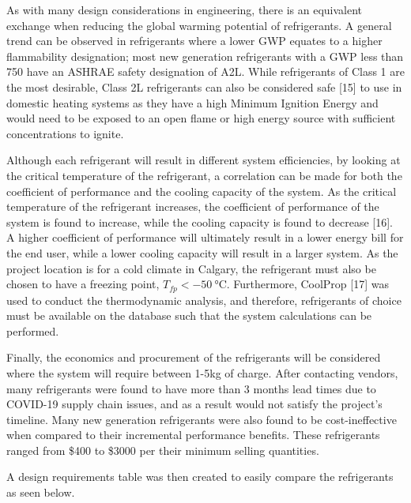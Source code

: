 \medskip
As with many design considerations in engineering, there is an equivalent exchange when reducing the global warming potential of refrigerants. A general trend can be observed in refrigerants where a lower GWP equates to a higher flammability designation; most new generation refrigerants with a GWP less than 750 have an ASHRAE safety designation of A2L. While refrigerants of Class 1 are the most desirable, Class 2L refrigerants can also be considered safe [15] to use in domestic heating systems as they have a high Minimum Ignition Energy and would need to be exposed to an open flame or high energy source with sufficient concentrations to ignite.

\medskip
Although each refrigerant will result in different system efficiencies, by looking at the critical temperature of the refrigerant, a correlation can be made for both the coefficient of performance and the cooling capacity of the system. As the critical temperature of the refrigerant increases, the coefficient of performance of the system is found to increase, while the cooling capacity is found to decrease [16]. A higher coefficient of performance will ultimately result in a lower energy bill for the end user, while a lower cooling capacity will result in a larger system. As the project location is for a cold climate in Calgary, the refrigerant must also be chosen to have a freezing point, $T_{fp} < \SI{-50}{\celsius}$. Furthermore, CoolProp [17] was used to conduct the thermodynamic analysis, and therefore, refrigerants of choice must be available on the database such that the system calculations can be performed.

\medskip
Finally, the economics and procurement of the refrigerants will be considered where the system will require between 1-5kg of charge. After contacting vendors, many refrigerants were found to have more than 3 months lead times due to COVID-19 supply chain issues, and as a result would not satisfy the project’s timeline. Many new generation refrigerants were also found to be cost-ineffective when compared to their incremental performance benefits. These refrigerants ranged from \$400 to \$3000 per their minimum selling quantities.

\medskip
A design requirements table was then created to easily compare the refrigerants as seen below.

